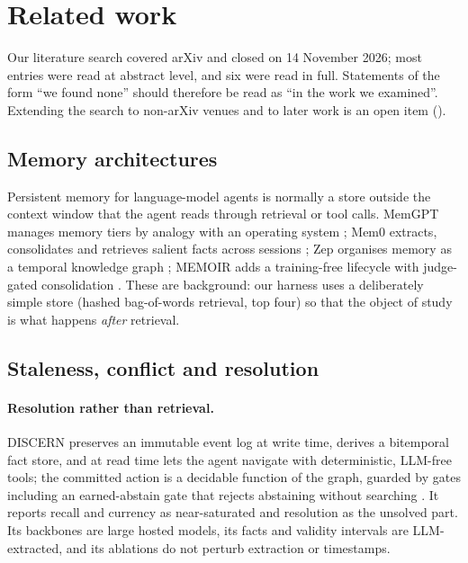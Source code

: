 \section{Related work}
\label{sec:related}

Our literature search covered arXiv and closed on 14 November 2026; most entries were read at abstract level, and
six were read in full. Statements of the form ``we found none'' should therefore be read as ``in the work we
examined''. Extending the search to non-arXiv venues and to later work is an open item
().

\subsection{Memory architectures}

Persistent memory for language-model agents is normally a store outside the context window that the agent reads
through retrieval or tool calls. MemGPT manages memory tiers by analogy with an operating system
\citep{packer2023memgpt}; Mem0 extracts, consolidates and retrieves salient facts across sessions
\citep{chhikara2025mem0}; Zep organises memory as a temporal knowledge graph \citep{rasmussen2025zep}; MEMOIR adds
a training-free lifecycle with judge-gated consolidation \citep{anand2026memoir}. These are background: our harness
uses a deliberately simple store (hashed bag-of-words retrieval, top four) so that the object of study is what
happens \emph{after} retrieval.

\subsection{Staleness, conflict and resolution}

\paragraph{Resolution rather than retrieval.} DISCERN preserves an immutable event log at write time, derives a
bitemporal fact store, and at read time lets the agent navigate with deterministic, LLM-free tools; the committed
action is a decidable function of the graph, guarded by gates including an earned-abstain gate that rejects
abstaining without searching \citep{ahuja2026discern}. It reports recall and currency as near-saturated and
resolution as the unsolved part. Its backbones are large hosted models, its facts and validity intervals are
LLM-extracted, and its ablations do not perturb extraction or timestamps.

